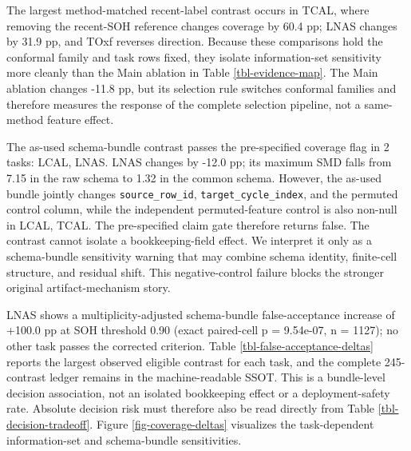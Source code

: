 \documentclass[
  number,
  preprint]{elsarticle}
\begin{document}
The largest method-matched recent-label contrast occurs in TCAL, where
removing the recent-SOH reference changes coverage by 60.4 pp; LNAS
changes by 31.9 pp, and TOxf reverses direction. Because these
comparisons hold the conformal family and task rows fixed, they isolate
information-set sensitivity more cleanly than the Main ablation in Table
\ref{tbl-evidence-map}. The Main ablation changes -11.8 pp, but its
selection rule switches conformal families and therefore measures the
response of the complete selection pipeline, not a same-method feature
effect.

The as-used schema-bundle contrast passes the pre-specified coverage
flag in 2 tasks: LCAL, LNAS. LNAS changes by -12.0 pp; its maximum SMD
falls from 7.15 in the raw schema to 1.32 in the common schema. However,
the as-used bundle jointly changes \texttt{source\_row\_id},
\texttt{target\_cycle\_index}, and the permuted control column, while
the independent permuted-feature control is also non-null in LCAL, TCAL.
The pre-specified claim gate therefore returns false. The contrast
cannot isolate a bookkeeping-field effect. We interpret it only as a
schema-bundle sensitivity warning that may combine schema identity,
finite-cell structure, and residual shift. This negative-control failure
blocks the stronger original artifact-mechanism story.

LNAS shows a multiplicity-adjusted schema-bundle false-acceptance
increase of +100.0 pp at SOH threshold 0.90 (exact paired-cell p =
9.54e-07, n = 1127); no other task passes the corrected criterion. Table
\ref{tbl-false-acceptance-deltas} reports the largest observed eligible
contrast for each task, and the complete 245-contrast ledger remains in
the machine-readable SSOT. This is a bundle-level decision association,
not an isolated bookkeeping effect or a deployment-safety rate. Absolute
decision risk must therefore also be read directly from Table
\ref{tbl-decision-tradeoff}. Figure \ref{fig-coverage-deltas} visualizes
the task-dependent information-set and schema-bundle sensitivities.
\end{document}
